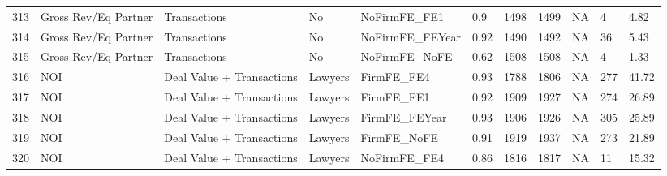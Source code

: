 \begin{table}[ht]
\begin{tabular}{rllllllllll}
  313 & Gross Rev/Eq Partner & Transactions & No & NoFirmFE\_FE1 & 0.9 & 1498 & 1499 & NA & 4 & 4.82 \\ 
  314 & Gross Rev/Eq Partner & Transactions & No & NoFirmFE\_FEYear & 0.92 & 1490 & 1492 & NA & 36 & 5.43 \\ 
  315 & Gross Rev/Eq Partner & Transactions & No & NoFirmFE\_NoFE & 0.62 & 1508 & 1508 & NA & 4 & 1.33 \\ 
  316 & NOI & Deal Value + Transactions & Lawyers & FirmFE\_FE4 & 0.93 & 1788 & 1806 & NA & 277 & 41.72 \\ 
  317 & NOI & Deal Value + Transactions & Lawyers & FirmFE\_FE1 & 0.92 & 1909 & 1927 & NA & 274 & 26.89 \\ 
  318 & NOI & Deal Value + Transactions & Lawyers & FirmFE\_FEYear & 0.93 & 1906 & 1926 & NA & 305 & 25.89 \\ 
  319 & NOI & Deal Value + Transactions & Lawyers & FirmFE\_NoFE & 0.91 & 1919 & 1937 & NA & 273 & 21.89 \\ 
  320 & NOI & Deal Value + Transactions & Lawyers & NoFirmFE\_FE4 & 0.86 & 1816 & 1817 & NA & 11 & 15.32 \\ 
   \hline
\end{tabular}
\end{table}
